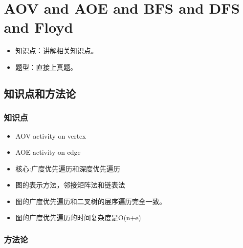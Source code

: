 
\chapter{AOV and AOE and BFS and DFS and Floyd}
\label{chap8}

\begin{itemize}[noitemsep,topsep=0pt,parsep=0pt,partopsep=0pt]
	\item 知识点：讲解相关知识点。
	\item 题型：直接上真题。
\end{itemize}

\section{知识点和方法论}

\subsection{知识点}
\begin{itemize}[noitemsep,topsep=0pt,parsep=0pt,partopsep=0pt]
	\item AOV activity on vertex
	\item AOE activity on edge
	\item 核心:广度优先遍历和深度优先遍历
	\item 图的表示方法，邻接矩阵法和链表法
	\item 图的广度优先遍历和二叉树的层序遍历完全一致。
	\item 图的广度优先遍历的时间复杂度是O(n+e) 
\end{itemize}

\subsection{方法论}


